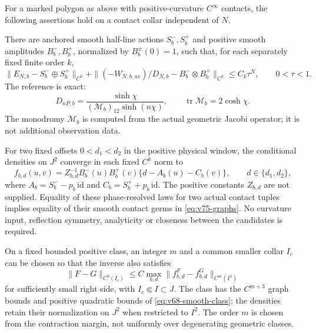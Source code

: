\begin{theorem}
\label{thm:v75-main}
\label{thm:v76-main}\label{thm:v70-main}
For a marked polygon as above with positive-curvature $C^\infty$
contacts, the following assertions hold on a contact collar independent
of $N$.

There are anchored smooth half-line actions $S_b^-,S_b^+$ and positive
smooth amplitudes $B_b^-,B_b^+$, normalized by $B_b^\pm(0)=1$, such
that, for each separately fixed finite order $k$,
\begin{equation}\label{eq:v75-relative}
 \|E_{N,b}-S_b^-\oplus S_b^+\|_{C^k}
 +\|(-W_{N,b,uv})/D_{N,b}-B_b^-\otimes B_b^+\|_{C^k}
 \le C_k\tau^N,\qquad 0<\tau<1.
\end{equation}
The reference is exact:
\begin{equation}\label{eq:v75-reference}
 D_{nP,b}=\frac{\sinh\chi}
  {(\mathcal M_b)_{12}\sinh(n\chi)},\qquad
 \operatorname{tr}\mathcal M_b=2\cosh\chi.
\end{equation}
The monodromy $\mathcal M_b$ is computed from the actual geometric
Jacobi operator; it is not additional observation data.

For two fixed offsets $0<d_1<d_2$ in the positive physical window,
the conditional densities on $J^2$ converge in each fixed $C^k$ norm
to
\begin{equation}\label{eq:v75-law}
 f_{b,d}(u,v)=Z_{b,d}^{-1}B_b^-(u)B_b^+(v)
       \{d-A_b(u)-C_b(v)\},\qquad d\in\{d_1,d_2\},
\end{equation}
where $A_b=S_b^--p_b\,\mathrm{id}$ and
$C_b=S_b^++p_b\,\mathrm{id}$.  The positive constants $Z_{b,d}$
are not supplied.  Equality of these phase-resolved laws for two actual
contact tuples implies equality of their smooth contact germs in
\eqref{eq:v75-graphs}.  No curvature input, reflection symmetry,
analyticity or closeness between the candidates is required.

On a fixed bounded positive class, an integer $m$ and a common smaller
collar $I_c$ can be chosen so that the inverse also satisfies
\begin{equation}\label{eq:v75-stability}
 \|F-G\|_{C^0(I_c)}
 \le C\max_{b,d}\|f^F_{b,d}-f^G_{b,d}\|_{C^m(I^2)}
\end{equation}
for sufficiently small right side, with $I_c\Subset I\subset J$.
The class has the $C^{m+3}$ graph bounds and positive quadratic bounds
of \eqref{eq:v68-smooth-class}; the densities retain their normalization
on $J^2$ when restricted to $I^2$.  The order $m$ is chosen from the
contraction margin, not uniformly over degenerating geometric classes.
\end{theorem}

